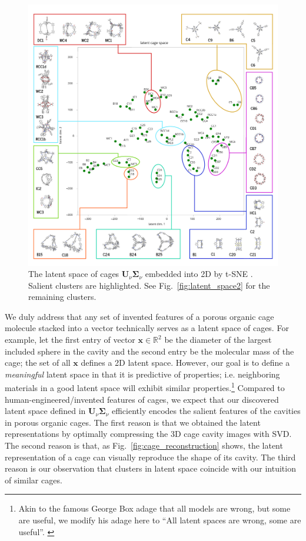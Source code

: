 \documentclass[journal=jacsat,manuscript=article,layout=traditional]{achemso}
\begin{document}
\begin{figure}
\centering
	\includegraphics[width=\columnwidth]{../latent_cage_space_2D_marked_main.png}
	\caption{The latent space of cages $\mathbf{U}_\nu \mathbf{\Sigma}_\nu$ embedded into 2D by t-SNE \cite{maaten2008visualizing,wattenberg2016how}. Salient clusters are highlighted. See Fig.~\ref{fig:latent_space2} for the remaining clusters.
	} \label{fig:latent_space}
\end{figure}

We duly address that any set of invented features of a porous organic cage molecule stacked into a vector technically serves as a latent space of cages. For example, let the first entry of vector $\mathbf{x}\in \mathbb{R}^2$ be the diameter of the largest included sphere in the cavity and the second entry be the molecular mass of the cage; the set of all $\mathbf{x}$ defines a 2D latent space. However, our goal is to define a \emph{meaningful} latent space in that it is predictive of properties; i.e. neighboring materials in a good latent space will exhibit similar properties.\footnote[3]{Akin to the famous George Box adage that all models are wrong, but some are useful, we modify his adage here to ``All latent spaces are wrong, some are useful''. \cite{box1976science}} Compared to human-engineered/invented features of cages, we expect that our discovered latent space defined in $\mathbf{U}_\nu \mathbf{\Sigma}_\nu$ efficiently encodes the salient features of the cavities in porous organic cages. The first reason is that we obtained the latent representations by optimally compressing the 3D cage cavity images with SVD. The second reason is that, as Fig.~\ref{fig:cage_reconstruction} shows, the latent representation of a cage can visually reproduce the shape of its cavity. The third reason is our observation that clusters in latent space coincide with our intuition of similar cages. 
\end{document}
